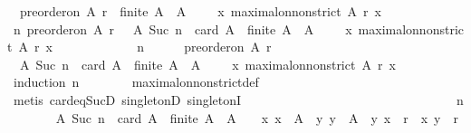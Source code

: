 \begin{isabellebody}
\ \ {\isachardoublequoteopen}preorder{\isacharunderscore}on\ A\ r\ {\isasymlongrightarrow}\ finite\ A\ {\isasymlongrightarrow}\ A\ {\isasymnoteq}\ {\isasymemptyset}\ {\isasymlongrightarrow}\ {\isacharparenleft}{\isasymexists}\ x{\isachardot}\ maximal{\isacharunderscore}on{\isacharunderscore}non{\isacharunderscore}strict\ A\ r\ x{\isacharparenright}{\isachardoublequoteclose}\isanewline
%
\isadelimproof
%
\endisadelimproof
%
\isatagproof
{}\isamarkupfalse%
\ {\isacharminus}\ \isanewline
\ \ \isamarkupfalse%
\ {\isachardoublequoteopen}{\isasymAnd}n{\isachardot}\ preorder{\isacharunderscore}on\ A\ r\ {\isasymLongrightarrow}\ {\isacharparenleft}{\isasymforall}\ A{\isachardot}\ Suc\ n\ {\isacharequal}\ card\ A\ {\isasymlongrightarrow}\ finite\ A\ {\isasymlongrightarrow}\ A\ {\isasymnoteq}\ {\isasymemptyset}\ {\isasymlongrightarrow}\ {\isacharparenleft}{\isasymexists}\ x{\isachardot}\ maximal{\isacharunderscore}on{\isacharunderscore}non{\isacharunderscore}strict\ A\ r\ x{\isacharparenright}{\isacharparenright}{\isachardoublequoteclose}\isanewline
\ \ \isanewline
\ \ \isamarkupfalse%
\ {\isacharminus}\isanewline
\ \ \ \ \isamarkupfalse%
\ n\isanewline
\ \ \ \ \isamarkupfalse%
\ {\isachardoublequoteopen}preorder{\isacharunderscore}on\ A\ r{\isachardoublequoteclose}\isanewline
\ \ \ \ \isamarkupfalse%
\ {\isachardoublequoteopen}{\isasymforall}\ A{\isachardot}\ Suc\ n\ {\isacharequal}\ card\ A\ {\isasymlongrightarrow}\ finite\ A\ {\isasymlongrightarrow}\ A\ {\isasymnoteq}\ {\isasymemptyset}\ {\isasymlongrightarrow}\ {\isacharparenleft}{\isasymexists}\ x{\isachardot}\ maximal{\isacharunderscore}on{\isacharunderscore}non{\isacharunderscore}strict\ A\ r\ x{\isacharparenright}{\isachardoublequoteclose}\isanewline
\ \ \ \ \ \ \isamarkupfalse%
\ {\isacharparenleft}induction\ n{\isacharparenright}\isanewline
\ \ \ \ \ \ \isamarkupfalse%
\ maximal{\isacharunderscore}on{\isacharunderscore}non{\isacharunderscore}strict{\isacharunderscore}def\isanewline
\ \ \ \ \ \ \ \isamarkupfalse%
\ {\isacharparenleft}metis\ card{\isacharunderscore}eq{\isacharunderscore}SucD\ singletonD\ singletonI{\isacharparenright}\isanewline
\ \ \ \ \ \ \isanewline
\ \ \ \ \ \ \isanewline
\ \ \ \ \isamarkupfalse%
\ {\isacharminus}\ \ \ \ \ \ \isanewline
\ \ \ \ \ \ \isamarkupfalse%
\ n\isanewline
\ \ \ \ \ \ \isamarkupfalse%
\ {\isachardoublequoteopen}{\isasymforall}A{\isachardot}\ Suc\ n\ {\isacharequal}\ card\ A\ {\isasymlongrightarrow}\ finite\ A\ {\isasymlongrightarrow}\ A\ {\isasymnoteq}\ {\isasymemptyset}\ {\isasymlongrightarrow}\ {\isacharparenleft}{\isasymexists}x{\isachardot}\ x\ {\isasymin}\ A\ {\isasymand}\ {\isacharparenleft}{\isasymforall}y{\isachardot}\ y\ {\isasymin}\ A\ {\isasymlongrightarrow}\ {\isacharparenleft}y{\isacharcomma}\ x{\isacharparenright}\ {\isasymin}\ r\ {\isasymor}\ {\isacharparenleft}x{\isacharcomma}\ y{\isacharparenright}\ {\isasymnotin}\ r{\isacharparenright}{\isacharparenright}{\isachardoublequoteclose}\isanewline

\end{isabellebody}
